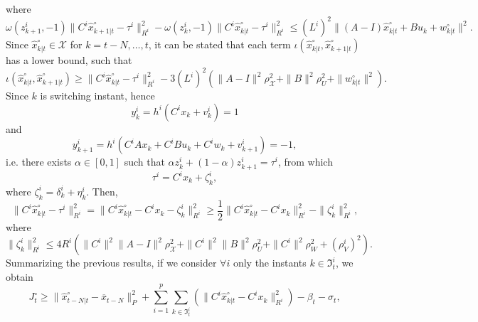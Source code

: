 \documentclass[11pt,journal,onecolumn]{IEEEtran}
\begin{document}
where
\begin{equation*}\label{69}
\omega(z_{k+1}^{i},-1)\|C^{i}\hat{x}_{k+1|t}^{\circ}-\tau^{i}\|^{2}_{R^{i}}-\omega(z_{k}^{i},-1)\|C^{i}\hat{x}_{k|t}^{\circ}-\tau^{i}\|^{2}_{R^{i}}
\leq(L^{i})^{2}\|(A-I)\hat{x}_{k|t}^{\circ}+Bu_{k}+w^{\circ}_{k|t}\|^{2}.
\end{equation*}
Since $\hat{x}^{\circ}_{k|t}\in\mathcal X$ for $k=t-N,\ldots,t$, it can be stated that each term $\iota(\hat{x}_{k|t}^{\circ},\hat{x}_{k+1|t}^{\circ})$ has a lower bound, such that
\begin{equation*}\label{51}
\iota(\hat{x}_{k|t}^{\circ},\hat{x}_{k+1|t}^{\circ})\geq\|C^{i}\hat{x}_{k|t}^{\circ}-\tau^{i}\|^{2}_{R^{i}}-3(L^{i})^{2}\left(\|A-I\|^{2}\rho_{\mathcal X}^{2}
+\|B\|^{2}\rho_{U}^{2}+\|w^{\circ}_{k|t}\|^{2}\right).
\end{equation*}
Since $k$ is switching instant, hence
\begin{equation*}
y^{i}_{k}=h^{i}(C^{i}x_{k}+v^{i}_{k})=1
\end{equation*}
and
\begin{equation*}
y^{i}_{k+1}=h^{i}(C^{i}Ax_{k}+C^{i}Bu_{k}+C^{i}w_{k}+v^{i}_{k+1})=-1,
\end{equation*}
i.e. there exists $\alpha\in[0,1]$ such that
$\alpha z^{i}_{k}+(1-\alpha)z^{i}_{k+1}=\tau^{i}$, from which
\begin{equation*}\label{52}
\tau^{i}=C^{i}x_{k}+\zeta^{i}_{k},
\end{equation*}
where $\zeta^{i}_{k}=\delta^{i}_{k}+\eta^{i}_{k}$. Then,
\begin{equation*}\label{54}
\|C^{i}\hat{x}_{k|t}^{\circ}-\tau^{i}\|^{2}_{R^{i}} = \|C^{i}\hat{x}_{k|t}^{\circ}-C^{i}x_{k}-\zeta^{i}_{k}\|^{2}_{R^{i}}
\geq \frac{1}{2}\|C^{i}\hat{x}_{k|t}^{\circ}-C^{i}x_{k}\|^{2}_{R^{i}}-\|\zeta^{i}_{k}\|^{2}_{R^{i}},
\end{equation*}
where
\begin{equation*}\label{55}
\|\zeta^{i}_{k}\|^{2}_{R^{i}} \leq 4R^{i}\left(\|C^{i}\|^{2}\|A-I\|^{2}\rho_{\mathcal X}^{2}+\|C^{i}\|^{2}\|B\|^{2}\rho_{U}^{2}
+ \|C^{i}\|^{2}\rho_{W}^{2}+(\rho_{V}^{i})^{2}\right).
\end{equation*}
Summarizing the previous results, if we consider $\forall i$ only the instants $k\in\mathfrak{I}_{t}^{i}$, we obtain
\begin{equation*}\label{56}
J_{t}^{\circ}\geq\|\hat{x}_{t-N|t}^{\circ}-\overline{x}_{t-N}\|^{2}_{P}+\sum_{i=1}^{p}\sum_{k\in\mathfrak{I}_{t}^{i}}
\left(\|C^{i}\hat{x}_{k|t}^{\circ}-C^{i}x_{k}\|^{2}_{R^{i}}\right)-\beta_{t}-\sigma_{t},
\end{equation*}
\end{document}
